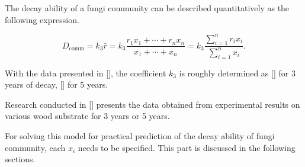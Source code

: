 The decay ability of a fungi community can be described quantitatively as the following expression.

\begin{equation}\label{eq:dcomm}
    D_\text{comm} =
    k_3\bar{r} =
    k_3\frac{r_1x_1 + \cdots + r_nx_n}{x_1 + \cdots + x_n} =
    k_3\dfrac{\sum_{i=1}^n r_ix_i}{\sum_{i=1}^n x_i}.
\end{equation}


With the data presented in [], the coefficient $k_3$ is roughly determined as [] for 3 years of decay, [] for 5 years. 


Research conducted in [] presents the data obtained from experimental results on various wood substrate for 3 years or 5 years.

For solving this model for practical prediction of the decay ability of fungi community, each $x_i$ needs to be specified. This part is discussed in the following sections.
